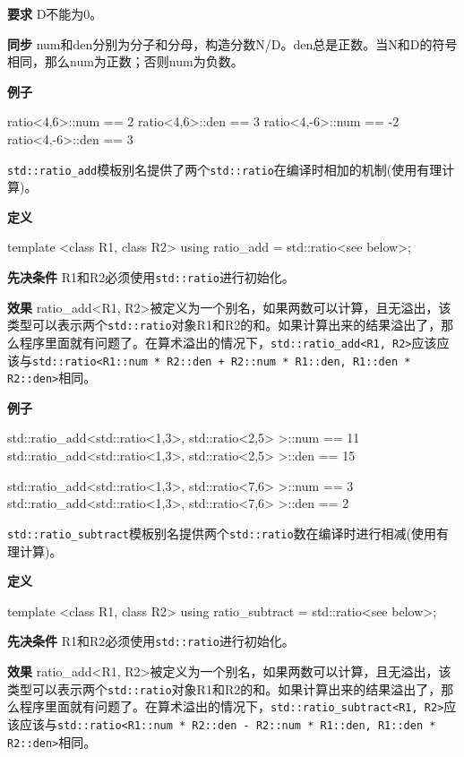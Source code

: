 \textbf{要求}
D不能为0。

\textbf{同步}
num和den分别为分子和分母，构造分数N/D。den总是正数。当N和D的符号相同，那么num为正数；否则num为负数。

\textbf{例子}

\begin{cpp}
ratio<4,6>::num == 2
ratio<4,6>::den == 3
ratio<4,-6>::num == -2
ratio<4,-6>::den == 3
\end{cpp}


\texttt{std::ratio\_add}模板别名提供了两个\texttt{std::ratio}在编译时相加的机制(使用有理计算)。

\textbf{定义}

\begin{cpp}
template <class R1, class R2>
using ratio_add = std::ratio<see below>;
\end{cpp}

\textbf{先决条件}
R1和R2必须使用\texttt{std::ratio}进行初始化。

\textbf{效果}
ratio\_add<R1, R2>被定义为一个别名，如果两数可以计算，且无溢出，该类型可以表示两个\texttt{std::ratio}对象R1和R2的和。如果计算出来的结果溢出了，那么程序里面就有问题了。在算术溢出的情况下，\texttt{std::ratio\_add<R1, R2>}应该应该与\texttt{std::ratio<R1::num * R2::den + R2::num * R1::den, R1::den * R2::den>}相同。

\textbf{例子}

\begin{cpp}
std::ratio_add<std::ratio<1,3>, std::ratio<2,5> >::num == 11
std::ratio_add<std::ratio<1,3>, std::ratio<2,5> >::den == 15

std::ratio_add<std::ratio<1,3>, std::ratio<7,6> >::num == 3
std::ratio_add<std::ratio<1,3>, std::ratio<7,6> >::den == 2
\end{cpp}


\texttt{std::ratio\_subtract}模板别名提供两个\texttt{std::ratio}数在编译时进行相减(使用有理计算)。

\textbf{定义}

\begin{cpp}
template <class R1, class R2>
using ratio_subtract = std::ratio<see below>;
\end{cpp}

\textbf{先决条件}
R1和R2必须使用\texttt{std::ratio}进行初始化。

\textbf{效果}
ratio\_add<R1, R2>被定义为一个别名，如果两数可以计算，且无溢出，该类型可以表示两个\texttt{std::ratio}对象R1和R2的和。如果计算出来的结果溢出了，那么程序里面就有问题了。在算术溢出的情况下，\texttt{std::ratio\_subtract<R1, R2>}应该应该与\texttt{std::ratio<R1::num * R2::den - R2::num * R1::den, R1::den * R2::den>}相同。

